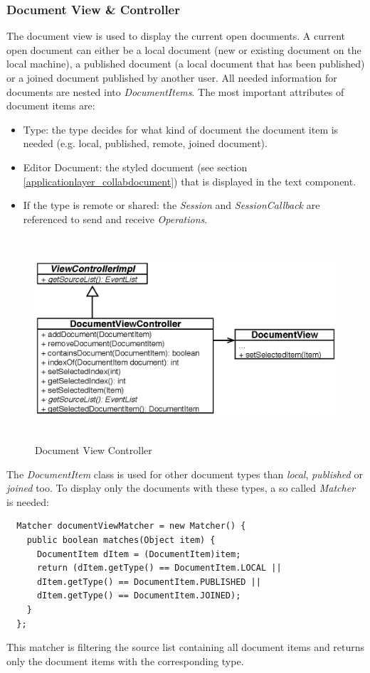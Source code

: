 \subsubsection{Document View \& Controller}
The document view is used to display the current open documents. A current open document can either be a local document (new or existing document on the local machine), a published document (a local document that has been published) or a joined document published by another user. All needed information for documents are nested into \textit{DocumentItems}. The most important attributes of document items are:
\begin{itemize}
\item Type: the type decides for what kind of document the document item is needed (e.g. local, published, remote, joined document).
\item Editor Document: the styled document (see section \ref{applicationlayer_collabdocument}) that is displayed in the text component.
\item If the type is remote or shared: the \textit{Session} and \textit{SessionCallback} are referenced to send and receive \textit{Operations}.
\end{itemize}
\begin{figure}[H]
\begin{center}
  \includegraphics[height=2.99in, width=5.62in]{../images/finalreport/application_documentview.eps}
\caption{Document View Controller}
\label{application_documentview}
\end{center}
\end{figure}
The \textit{DocumentItem} class is used for other document types than \textit{local}, \textit{published} or \textit{joined} too. To display only the documents with these types, a so called \textit{Matcher} is needed:
\begin{verbatim}
  Matcher documentViewMatcher = new Matcher() {
    public boolean matches(Object item) {
      DocumentItem dItem = (DocumentItem)item;
      return (dItem.getType() == DocumentItem.LOCAL ||
      dItem.getType() == DocumentItem.PUBLISHED ||
      dItem.getType() == DocumentItem.JOINED);
    }
  };
\end{verbatim}
This matcher is filtering the source list containing all document items and returns only the document items with the corresponding type.


